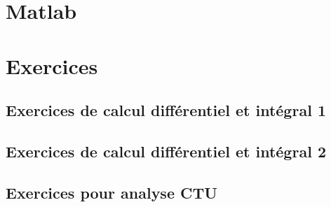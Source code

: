 \documentclass[a4paper,twoside,11pt]{book}
\begin{document}

\emptyInputPath
{}

\part{Matlab}




\emptyInputPath
{}
\part{Exercices}







\chapter{Exercices de calcul différentiel et intégral 1}



\chapter{Exercices de calcul différentiel et intégral 2}




\chapter{Exercices pour analyse CTU}


{
}



\emptyInputPath
{}

\end{document}

